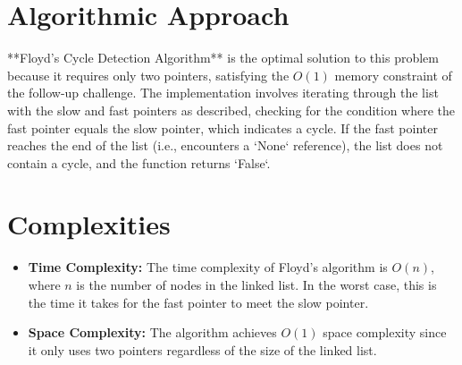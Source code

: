 
\section*{Algorithmic Approach}

**Floyd's Cycle Detection Algorithm** is the optimal solution to this problem because it requires only two pointers, satisfying the \(O(1)\) memory constraint of the follow-up challenge. The implementation involves iterating through the list with the slow and fast pointers as described, checking for the condition where the fast pointer equals the slow pointer, which indicates a cycle. If the fast pointer reaches the end of the list (i.e., encounters a `None` reference), the list does not contain a cycle, and the function returns `False`.

\section*{Complexities}

\begin{itemize}
    \item \textbf{Time Complexity:} The time complexity of Floyd's algorithm is \(O(n)\), where \(n\) is the number of nodes in the linked list. In the worst case, this is the time it takes for the fast pointer to meet the slow pointer.
    \item \textbf{Space Complexity:} The algorithm achieves \(O(1)\) space complexity since it only uses two pointers regardless of the size of the linked list.
\end{itemize}

